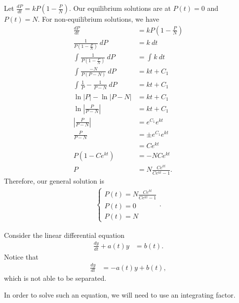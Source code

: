 \documentclass[10pt]{mypackage}
\begin{document}
\begin{example}
  Let $\frac{dP}{dt} = kP\left(1-\frac{P}{N}\right)$. Our equilibrium solutions are at $P(t)=0$ and $P(t)=N$. For non-equilibrium solutions, we have
  \begin{align*}
    \frac{dP}{dt} &= kP\left(1-\frac{P}{N}\right)\\
    \frac{1}{P\left(1-\frac{P}{N}\right)}\: dP &= k\:dt\\
    \int_{}^{} \frac{1}{P\left(1-\frac{P}{N}\right)}\:dP &= \int_{}^{} k\:dt\\
    \int_{}^{} \frac{-N}{P\left(P-N\right)}\:dP &= kt + C_1\\
    \int_{}^{} \frac{1}{P} - \frac{1}{P-N}\:dP &= kt + C_1\\
    \ln \left\vert P \right\vert - \ln \left\vert P-N \right\vert &= kt + C_1\\
    \ln \left\vert \frac{P}{P-N} \right\vert &= kt + C_1\\
    \left\vert \frac{P}{P-N} \right\vert &= e^{C_1}e^{kt}\\
    \frac{P}{P-N} &= \pm e^{C_1}e^{kt}\\
                  &= Ce^{kt}\\
    P\left(1-Ce^{kt}\right) &= -NCe^{kt}\\
    P &= N\frac{Ce^{kt}}{Ce^{kt} - 1}.
  \end{align*}
  Therefore, our general solution is
  \begin{align*}
    \begin{cases}
      P(t) = N\frac{Ce^{kt}}{Ce^{kt} - 1}\\
      P(t) = 0\\
      P(t) = N
    \end{cases}.
  \end{align*}
\end{example}
\begin{example}
  Consider the linear differential equation
  \begin{align*}
    \frac{dy}{dt} + a(t) y &= b(t).
  \end{align*}
  Notice that
  \begin{align*}
    \frac{dy}{dt} &= -a(t)y + b(t),
  \end{align*}
  which is not able to be separated.\newline

  In order to solve such an equation, we will need to use an integrating factor.
\end{example}
\end{document}

